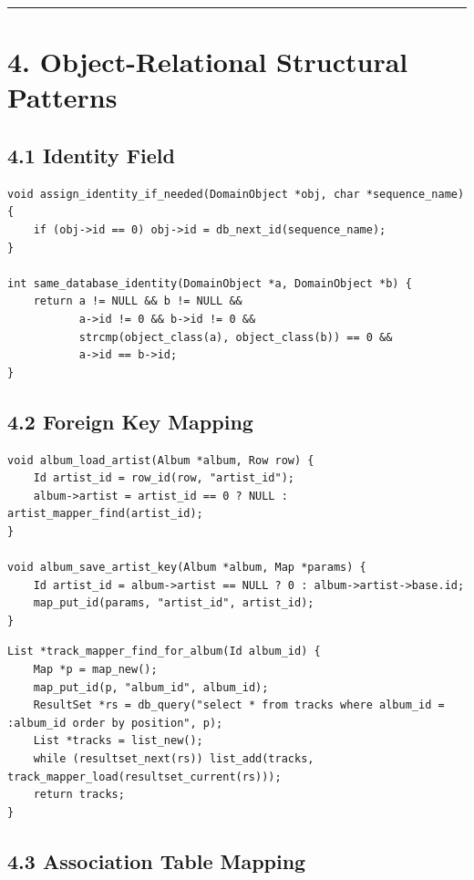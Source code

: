 \documentclass[11pt]{article}
\begin{document}
\begin{center}\rule{0.5\linewidth}{0.5pt}\end{center}

\section{4. Object-Relational Structural
Patterns}\label{object-relational-structural-patterns}

\subsection{4.1 Identity Field}\label{identity-field}

\begin{verbatim}
void assign_identity_if_needed(DomainObject *obj, char *sequence_name) {
    if (obj->id == 0) obj->id = db_next_id(sequence_name);
}

int same_database_identity(DomainObject *a, DomainObject *b) {
    return a != NULL && b != NULL &&
           a->id != 0 && b->id != 0 &&
           strcmp(object_class(a), object_class(b)) == 0 &&
           a->id == b->id;
}
\end{verbatim}

\subsection{4.2 Foreign Key Mapping}\label{foreign-key-mapping}

\begin{verbatim}
void album_load_artist(Album *album, Row row) {
    Id artist_id = row_id(row, "artist_id");
    album->artist = artist_id == 0 ? NULL : artist_mapper_find(artist_id);
}

void album_save_artist_key(Album *album, Map *params) {
    Id artist_id = album->artist == NULL ? 0 : album->artist->base.id;
    map_put_id(params, "artist_id", artist_id);
}
\end{verbatim}

\begin{verbatim}
List *track_mapper_find_for_album(Id album_id) {
    Map *p = map_new();
    map_put_id(p, "album_id", album_id);
    ResultSet *rs = db_query("select * from tracks where album_id = :album_id order by position", p);
    List *tracks = list_new();
    while (resultset_next(rs)) list_add(tracks, track_mapper_load(resultset_current(rs)));
    return tracks;
}
\end{verbatim}

\subsection{4.3 Association Table
Mapping}\label{association-table-mapping}
\end{document}
